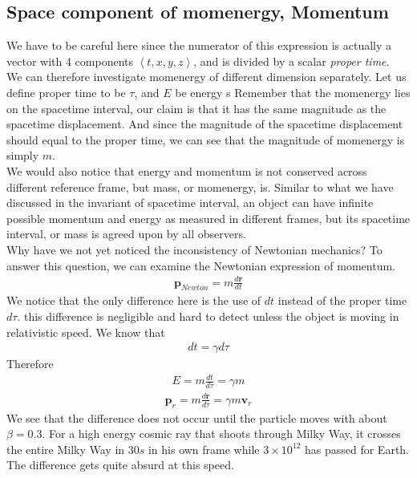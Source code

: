 \documentclass[12pt]{book}
\newcommand{\dydx}[2]{\frac{d #1}{d #2}}
\newcommand{\tribkt}[1]{\left< #1 \right>}
\begin{document}
\subsection{Space component of momenergy, Momentum}
We have to be careful here since the numerator of this expression is actually a vector with 4 components $\tribkt{t,x,y,z}$, and is divided by a scalar \textit{proper time}.\\
\newline
We can therefore investigate momenergy of different dimension separately. Let us define proper time to be $\tau$, and $E$ be energy
s
Remember that the momenergy lies on the spacetime interval, our claim is that it has the same magnitude as the spacetime displacement. And since the magnitude of the spacetime displacement should equal to the proper time, we can see that the magnitude of momenergy is simply $\textit{m}$.
\\
\newline
We would also notice that energy and momentum is not conserved across different reference frame, but mass, or momenergy, is. Similar to what we have discussed in the invariant of spacetime interval, an object can have infinite possible momentum and energy as measured in different frames, but its spacetime interval, or mass is agreed upon by all observers. \\
\newline
Why have we not yet noticed the inconsistency of Newtonian mechanics? To answer this question, we can examine the Newtonian expression of momentum. 
\begin{align}
\textbf{p}_{Newton} = m\dydx{\textbf{r}}{t}
\end{align}
We notice that the only difference here is the use of $dt$ instead of the proper time $d\tau$. this difference is negligible and hard to detect unless the object is moving in relativistic speed. We know that 
\begin{align}
dt = \gamma d\tau
\end{align}
Therefore 
\begin{align}
E = m \dydx{t}{\tau} = \gamma m
\end{align}
\begin{align}
\textbf{p}_r = m\dydx{\textbf{r}}{\tau} = \gamma m\textbf{v}_r
\end{align}
We see that the difference does not occur until the particle moves with about $\beta=0.3$. For a high energy cosmic ray that shoots through Milky Way, it crosses the entire Milky Way in $30s$ in his own frame while $3\times 10^{12}$ has passed for Earth. The difference gets quite absurd at this speed. 
\end{document}
